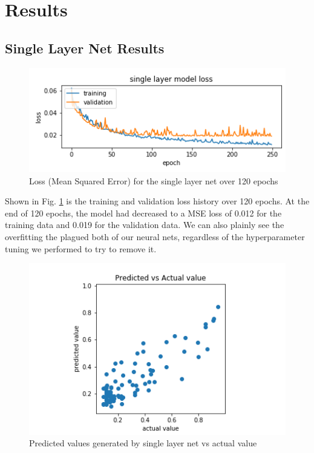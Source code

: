 \documentclass[conference]{IEEEtran}
\begin{document}
\section{Results}

\subsection{Single Layer Net Results}

\begin{figure}[htbp]
\centerline{\includegraphics[width=0.75\linewidth]{./Images/SingleModelLoss.png}}
\caption{Loss (Mean Squared Error) for the single layer net over 120 epochs}
\label{fig:SingleModelLoss}
\end{figure}

Shown in Fig. \ref{fig:SingleModelLoss} is the training and validation loss history over 120 epochs. At the end of 120 epochs, the model had decreased to a MSE loss of 0.012 for the training data and 0.019 for the validation data. We can also plainly see the overfitting the plagued both of our neural nets, regardless of the hyperparameter tuning we performed to try to remove it.

\begin{figure}[htbp]
\centerline{\includegraphics[width=0.75\linewidth]{./Images/SinglePredictedVAct.png}}
\caption{Predicted values generated by single layer net vs actual value}
\label{fig:SinglePredictedVAct}
\end{figure}
\end{document}
